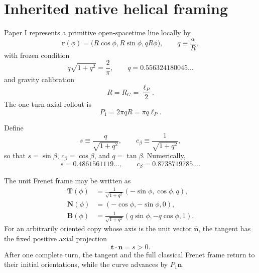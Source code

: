 \documentclass[10pt]{article}
\begin{document}
\section{Inherited native helical framing}
\label{sec:helix}

Paper I represents a primitive open-spacetime line locally by
\begin{equation}
\bm r(\phi)=
\bigl(R\cos\phi,R\sin\phi,qR\phi\bigr),
\qquad q\equiv\frac{a}{R},
\label{eq:helix}
\end{equation}
with frozen condition
\begin{equation}
q\sqrt{1+q^2}=\frac{2}{\pi},
\qquad
q=0.556324180045\ldots
\label{eq:qfreeze}
\end{equation}
and gravity calibration
\begin{equation}
R=R_G=\frac{\ell_P}{2}.
\label{eq:RG}
\end{equation}
The one-turn axial rollout is
\begin{equation}
P_1=2\pi qR=\pi q\ell_P.
\label{eq:P1}
\end{equation}

Define
\begin{equation}
s\equiv\frac{q}{\sqrt{1+q^2}},
\qquad
c_\beta\equiv\frac{1}{\sqrt{1+q^2}},
\label{eq:sc}
\end{equation}
so that $s=\sin\beta$, $c_\beta=\cos\beta$, and $q=\tan\beta$. Numerically,
\begin{equation}
s=0.4861561119\ldots,
\qquad
c_\beta=0.8738719785\ldots.
\label{eq:scnumeric}
\end{equation}

The unit Frenet frame may be written as
\begin{align}
\bm T(\phi)
&=\frac{1}{\sqrt{1+q^2}}
(-\sin\phi,\cos\phi,q),
\\
\bm N(\phi)
&=(-\cos\phi,-\sin\phi,0),
\\
\bm B(\phi)
&=\frac{1}{\sqrt{1+q^2}}
(q\sin\phi,-q\cos\phi,1).
\label{eq:frenet}
\end{align}
For an arbitrarily oriented copy whose axis is the unit vector $\hat{\bm n}$, the tangent has the fixed positive axial projection
\begin{equation}
\boxed{
\bm t\cdot\hat{\bm n}=s>0.
}
\label{eq:axialProjection}
\end{equation}
After one complete turn, the tangent and the full classical Frenet frame return to their initial orientations, while the curve advances by $P_1\hat{\bm n}$.
\end{document}
